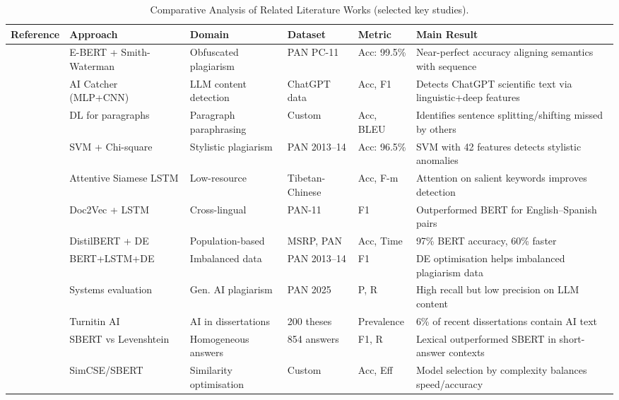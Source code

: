 \documentclass[12pt, a4paper]{article}
\begin{document}
\begin{table}[htbp]
\centering
\caption{Comparative Analysis of Related Literature Works (selected key studies).}
\label{tab:comparative}
\footnotesize
\begin{tabular}{p{2.2cm}p{2.2cm}p{2cm}p{1.5cm}p{1.5cm}p{3cm}}
	\toprule
	\textbf{Reference} & \textbf{Approach} & \textbf{Domain} & \textbf{Dataset} & \textbf{Metric} & \textbf{Main Result} \\
	\midrule
	\citet{Antonius2023} & E-BERT + Smith-Waterman & Obfuscated plagiarism & PAN PC-11 & Acc: 99.5\% & Near-perfect accuracy aligning semantics with sequence \\
	\midrule
	\citet{Alhijawi2025} & AI Catcher (MLP+CNN) & LLM content detection & ChatGPT data & Acc, F1 & Detects ChatGPT scientific text via linguistic+deep features \\
	\midrule
	\citet{Saqaabi2025} & DL for paragraphs & Paragraph paraphrasing & Custom & Acc, BLEU & Identifies sentence splitting/shifting missed by others \\
	\midrule
	\citet{ElRashidy2024} & SVM + Chi-square & Stylistic plagiarism & PAN 2013--14 & Acc: 96.5\% & SVM with 42 features detects stylistic anomalies \\
	\midrule
	\citet{Bao2024} & Attentive Siamese LSTM & Low-resource & Tibetan-Chinese & Acc, F-m & Attention on salient keywords improves detection \\
	\midrule
	\citet{Bouaine2023} & Doc2Vec + LSTM & Cross-lingual & PAN-11 & F1 & Outperformed BERT for English--Spanish pairs \\
	\midrule
	\citet{JingLiu2023} & DistilBERT + DE & Population-based & MSRP, PAN & Acc, Time & 97\% BERT accuracy, 60\% faster \\
	\midrule
	\citet{Moravvej2023} & BERT+LSTM+DE & Imbalanced data & PAN 2013--14 & F1 & DE optimisation helps imbalanced plagiarism data \\
	\midrule
	\citet{GreinerPetter2025} & Systems evaluation & Gen. AI plagiarism & PAN 2025 & P, R & High recall but low precision on LLM content \\
	\midrule
	\citet{Murch2025} & Turnitin AI & AI in dissertations & 200 theses & Prevalence & 6\% of recent dissertations contain AI text \\
	\midrule
	\citet{Lieharyani2025} & SBERT vs Levenshtein & Homogeneous answers & 854 answers & F1, R & Lexical outperformed SBERT in short-answer contexts \\
	\midrule
	\citet{LiuZhu2023} & SimCSE/SBERT & Similarity optimisation & Custom & Acc, Eff & Model selection by complexity balances speed/accuracy \\
	\bottomrule
\end{tabular}
\end{table}
\end{document}
